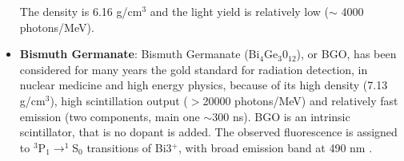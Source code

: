 \begin{itemize}
The density is 6.16 g/cm$^{3}$ and the light yield is relatively low ($\sim$ 4000 photons/MeV).
\item \textbf{Bismuth Germanate}: Bismuth Germanate (Bi$_{4}$Ge$_{3}$0$_{12}$), or BGO, has been considered for many years the gold standard for radiation detection, in nuclear medicine and high energy physics, because of its high density (7.13 g/cm$^{3}$), high scintillation output ($>$20000 photons/MeV) and relatively fast emission (two components, main one $\sim$300 ns).
BGO is an intrinsic scintillator, that is no dopant is added. The observed fluorescence is assigned to $^{3}$P$_{1}\rightarrow ^{1}$S$_{0}$ transitions of Bi3$^{+}$, with broad emission band at 490 nm \cite{Weber1996}.
\end{itemize}